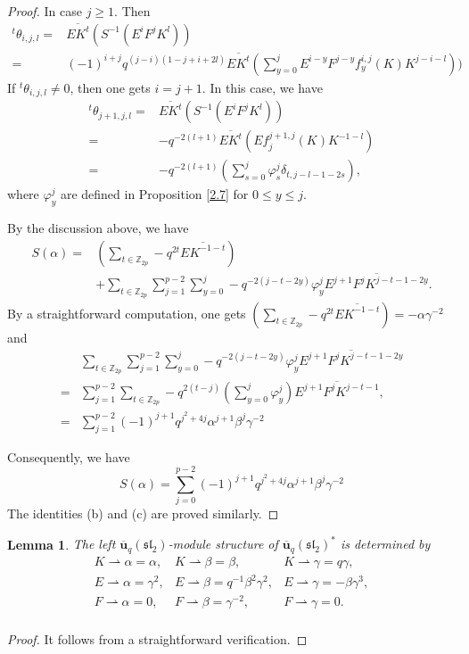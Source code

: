 \documentclass[10pt,oneside]{amsart}
\newtheorem{lemma}[proposition]{Lemma}
\theoremstyle{definition}
\def\<{\leqslant}
\def\>{\geqslant}
\def\a{\alpha}
\def\b{\beta}
\def\g{\gamma}
\begin{document}
\begin{proof}
In case $j\>1$. Then $$\begin{array}{rl}
{^t\theta_{i,j,l}}=&\overline{EK^t}(S^{-1}(E^iF^jK^l))\\
=&(-1)^{i+j}q^{(j-i)(1-j+i+2l)}
\overline{EK^t}(\sum_{y=0}^jE^{i-y}F^{j-y}f^{i,j}_{y}(K)K^{j-i-l}))
\end{array}$$
If ${^t\theta_{i,j,l}}\neq0$, then one gets $i=j+1$. In this case, we have
$$\begin{array}{rl}
{^t\theta_{j+1,j,l}}=&\overline{EK^t}(S^{-1}(E^iF^jK^l))\\
=&-q^{-2(l+1)}\overline{EK^t}(Ef^{j+1,j}_j(K)K^{-1-l})\\
=&-q^{-2(l+1)}(\sum_{s=0}^j\varphi^j_s\delta_{t,j-l-1-2s}),
\end{array}$$
where $\varphi^j_y$ are defined in Proposition \ref{2.7} for $0\<y\<j$.

 By the discussion above, we have
 $$\begin{array}{rl}
 S(\a)=&(\sum_{t\in \mathbb{Z}_{2p}}-q^{2t}\overline{EK^{-1-t}})\\
 &+\sum_{t\in \mathbb{Z}_{2p}}\sum_{j=1}^{p-2}\sum_{y=0}^j-q^{-2(j-t-2y)}
 \varphi^j_y\overline{E^{j+1}F^jK^{j-t-1-2y}}.
 \end{array}$$
 By a straightforward computation, one gets $(\sum_{t\in \mathbb{Z}_{2p}}-q^{2t}\overline{EK^{-1-t}})=-\a\g^{-2}$ and
$$\begin{array}{rl}
&\sum_{t\in \mathbb{Z}_{2p}}\sum_{j=1}^{p-2}\sum_{y=0}^j-q^{-2(j-t-2y)}\varphi^j_y
\overline{E^{j+1}F^jK^{j-t-1-2y}}\\
=&\sum_{j=1}^{p-2}\sum_{t\in\mathbb{Z}_{2p}}-q^{2(t-j)}(\sum_{y=0}^j\varphi^j_y)\overline{E^{j+1}F^jK^{j-t-1}},\\
=&\sum_{j=1}^{p-2}(-1)^{j+1}q^{j^2+4j}\a^{j+1}\b^j\g^{-2} \end{array}$$

Consequently, we have
$$S(\a)=\sum_{j=0}^{p-2}(-1)^{j+1}q^{j^2+4j}\a^{j+1}\b^j \g^{-2}$$
The identities \textup{(b)} and \textup{(c)} are proved similarly.
\end{proof}

\begin{lemma}\label{2.13}
The left $\mathbf{\overline{u}}_q(\mathfrak{sl_2})$-module structure of $\mathbf{\overline{u}}_q(\mathfrak{sl_2})^*$ is determined by
$$\begin{array}{rcl}
K\rightharpoonup \a=\a, &K\rightharpoonup \b=\b, &K\rightharpoonup \g=q\g,\\
E\rightharpoonup \a=\g^2, &E\rightharpoonup \b=q^{-1}\b^2\g^2, &E\rightharpoonup \g=-\b\g^3,\\
F\rightharpoonup \a=0, &F\rightharpoonup \b=\g^{-2}, &F\rightharpoonup \g=0.\\
\end{array}$$
\end{lemma}
\begin{proof}
It follows from a straightforward verification.
\end{proof}
\end{document}
